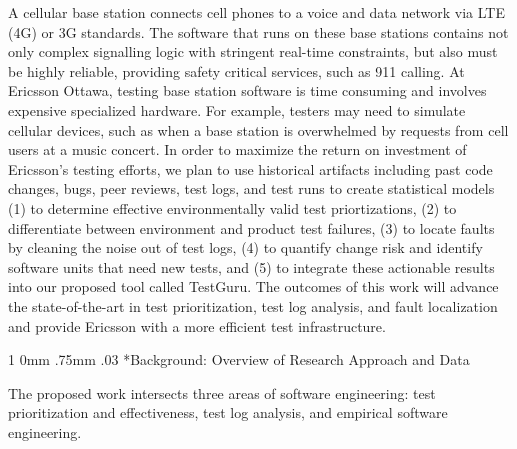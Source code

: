 \documentclass[12pt, letterpaper]{article}
\makeatletter
\renewcommand{\section}{\@startsection
{section}%
{1}%
{0mm}%
{.75mm}
{.03\baselineskip}%
{\normalfont\large\bf} %
}
\makeatother
\begin{document}
\fancyhead{}
\pagestyle{fancy}
\renewcommand{\headrulewidth}{0pt}

\begin{center}
\begin{LARGE}
\noindent
{}
\end{LARGE}
\end{center}



A cellular base station connects cell phones to a voice and data network via
LTE (4G) or 3G standards. The software that runs on these base stations
contains not only complex signalling logic with stringent real-time
constraints, but also must be highly reliable, providing safety critical
services, such as 911 calling. At Ericsson Ottawa, testing base station
software is time consuming and involves expensive specialized hardware. For
example, testers may need to simulate cellular devices, such as when a base
station is overwhelmed by requests from cell users at a music concert. In order
to maximize the return on investment of Ericsson's testing efforts, we plan to
use historical artifacts including past code changes, bugs, peer reviews, test
logs, and test runs to create statistical models (1) to determine effective
environmentally valid test priortizations, (2) to differentiate between
environment and product test failures, (3) to locate faults by cleaning the
noise out of test logs, (4) to quantify change risk and identify software units
that need new tests, and (5) to integrate these actionable results into our
proposed tool called TestGuru. The outcomes of this work will advance the
state-of-the-art in test prioritization, test log analysis, and fault
localization and provide Ericsson with a more efficient test infrastructure.

\section*{Background: Overview of Research Approach and Data}

The proposed work intersects three areas of software engineering: test
prioritization and effectiveness, test log analysis, and empirical software engineering. 
\end{document}
